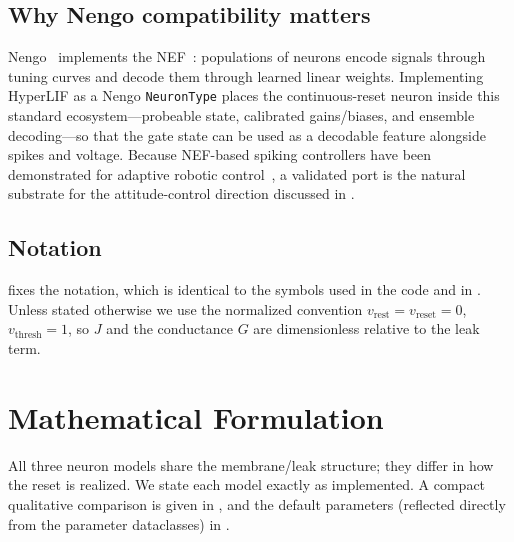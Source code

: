 \documentclass[11pt]{article}
\newcommand{\vth}{v_{\mathrm{thresh}}}
\newcommand{\vr}{v_{\mathrm{rest}}}
\newcommand{\vre}{v_{\mathrm{reset}}}
\newcommand{\code}[1]{\texttt{#1}}
\begin{document}
\subsection{Why Nengo compatibility matters}
Nengo~\cite{bekolay2014nengo} implements the NEF~\cite{eliasmith2003neural}:
populations of neurons encode signals through tuning curves and decode them
through learned linear weights. Implementing HyperLIF as a Nengo
\code{NeuronType} places the continuous-reset neuron inside this standard
ecosystem---probeable state, calibrated gains/biases, and ensemble decoding---so
that the gate state can be used as a decodable feature alongside spikes and
voltage. Because NEF-based spiking controllers have been demonstrated for
adaptive robotic control~\cite{dewolf2016reach}, a validated port is the natural
substrate for the attitude-control direction discussed in .

\subsection{Notation}
 fixes the notation, which is identical to the symbols used
in the code and in \cite{hyperlif_theory}. Unless stated otherwise we use the
normalized convention $\vr=\vre=0$, $\vth=1$, so $J$ and the conductance $G$ are
dimensionless relative to the leak term.


\section{Mathematical Formulation}\label{sec:formulation}
All three neuron models share the membrane/leak structure; they differ in how
the reset is realized. We state each model exactly as implemented. A compact
qualitative comparison is given in , and the default
parameters (reflected directly from the parameter dataclasses) in
.


\end{document}
